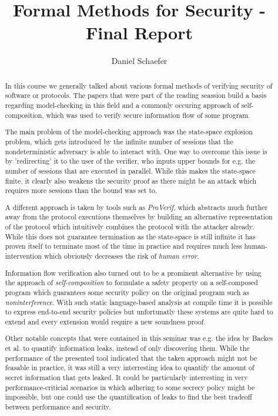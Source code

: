 \documentclass[a4paper,UKenglish]{lipics-v2018}
\title{Formal Methods for Security - Final Report}
\author{Daniel Schaefer}{2549458}{}{}{}
\begin{document}
\maketitle

\begin{abstract}

In this course we generally talked about various formal methods of verifying security of software or protocols. The papers that were part of the reading seassion build a basis regarding model-checking in this field and a commonly occuring approach of self-composition, which was used to verify secure information flow of some program.

The main problem of the model-checking approach was the state-space explosion problem, which gets introduced by the infinite number of sessions that the nondeterministic adversary is able to interact with. One way to overcome this issue is by 'redirecting' it to the user of the verifier, who inputs upper bounds for e.g. the number of sessions that are executed in parallel. While this makes the state-space finite, it clearly also weakens the security proof as there might be an attack which requires more sessions than the bound was set to.

A different approach is taken by tools such as \textit{ProVerif}, which abstracts much further away from the protocol executions themselves by building an alternative representation of the protocol which intuitively combines the protocol with the attacker already. While this does not guarantee termination as the state-space is still infinite it has proven itself to terminate most of the time in practice and requires much less human-intervention which obviously decreases the risk of \textit{human error}.

Information flow verification also turned out to be a prominent alternative by using the approach of \textit{self-composition} to formulate a safety property on a self-composed program which guarantees some security policy on the original program such as \textit{noninterference}. With such static language-based analysis at compile time it is possible to express end-to-end security policies but unfortunatly these systems are quite hard to extend and every extension would require a new soundness proof.

Other notable concepts that were contained in this seminar was e.g. the idea by Backes et al. to quantify information leaks, instead of only discovering them. While the performance of the presented tool indicated that the taken approach might not be feasable in practice, it was still a very interresting idea to quantify the amount of secret information that gets leaked. It could be particularly interresting in very performance-criticial scenarios in which adhering to some secrecy policy might be impossible, but one could use the quantification of leaks to find the best tradeoff between performance and security.


\end{abstract}
\end{document}
